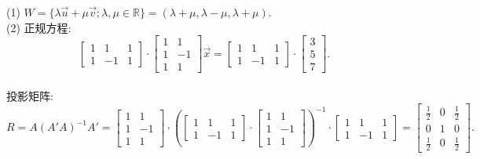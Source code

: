 \begin{solution}
    (1) $W=\{\lambda \overrightarrow{u} + \mu \overrightarrow{v};\lambda,\mu \in \mathbb{R}\}=(\lambda+\mu,\lambda - \mu, \lambda + \mu)$. \\
    (2) 正规方程:
    \begin{equation*}
        \begin{bmatrix}
            1 &1 &1 \\
            1 &-1 &1
        \end{bmatrix} \cdot 
        \begin{bmatrix}
            1 &1 \\
            1 &-1 \\
            1 &1
        \end{bmatrix} \overrightarrow{x} = \begin{bmatrix}
            1 &1 &1 \\
            1 &-1 &1
        \end{bmatrix} \cdot \begin{bmatrix}
            3\\
            5\\
            7
        \end{bmatrix}.
    \end{equation*}\\
    投影矩阵: $\displaystyle R=A(A'A)^{-1}A'=\begin{bmatrix}
        1 &1 \\
        1 &-1 \\
        1 &1
    \end{bmatrix}
    \cdot
    (\begin{bmatrix}
        1 &1 &1 \\
        1 &-1 &1
    \end{bmatrix} \cdot \begin{bmatrix}
        1 &1 \\
        1 &-1 \\
        1 &1
    \end{bmatrix})^{-1} \cdot \begin{bmatrix}
        1 &1 &1 \\
        1 &-1 &1
    \end{bmatrix}= \begin{bmatrix}
        \frac{1}{2} & 0 & \frac{1}{2} \\
        0 & 1 & 0 \\
        \frac{1}{2} & 0 & \frac{1}{2}
    \end{bmatrix}.$\\

\end{solution}
